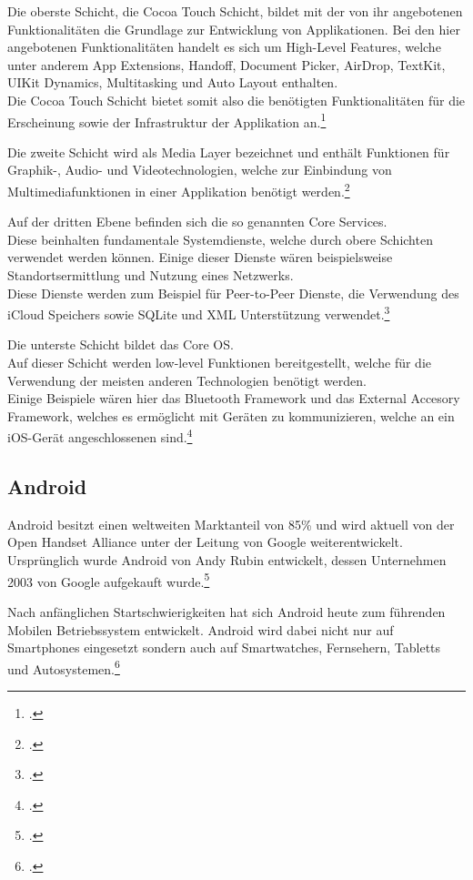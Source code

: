 Die oberste Schicht, die Cocoa Touch Schicht, bildet mit der von ihr angebotenen Funktionalitäten die Grundlage zur Entwicklung von Applikationen. Bei den hier angebotenen Funktionalitäten handelt es sich um High-Level Features, welche unter anderem App Extensions, Handoff, Document Picker, AirDrop, TextKit, UIKit Dynamics, Multitasking und Auto Layout enthalten.\\
Die Cocoa Touch Schicht bietet somit also die benötigten Funktionalitäten für die Erscheinung sowie der Infrastruktur der Applikation an.\footcite[vgl.:][]{CocoaTouchLayer}

Die zweite Schicht wird als Media Layer bezeichnet und enthält Funktionen für Graphik-, Audio- und Videotechnologien, welche zur Einbindung von Multimediafunktionen in einer Applikation benötigt werden.\footcite[vgl.:][]{MediaLayer}

Auf der dritten Ebene befinden sich die so genannten Core Services.\\
Diese beinhalten fundamentale Systemdienste, welche durch obere Schichten verwendet werden können. Einige dieser Dienste wären beispielsweise Standortsermittlung und Nutzung eines Netzwerks.\\
Diese Dienste werden zum Beispiel für Peer-to-Peer Dienste, die Verwendung des iCloud Speichers sowie SQLite und XML Unterstützung verwendet.\footcite[vgl.:][]{CoreServiceLayer}

Die unterste Schicht bildet das Core OS.\\
Auf dieser Schicht werden low-level Funktionen bereitgestellt, welche für die Verwendung der meisten anderen Technologien benötigt werden.\\
Einige Beispiele wären hier das Bluetooth Framework und das External Accesory Framework, welches es ermöglicht mit Geräten zu kommunizieren, welche an ein iOS-Gerät angeschlossenen sind.\footcite[vgl.:][]{CoreOSLayer}

\subsection{Android}
Android besitzt einen weltweiten Marktanteil von 85\% und wird aktuell von der Open Handset Alliance unter der Leitung von Google weiterentwickelt.\\
Ursprünglich wurde Android von Andy Rubin entwickelt, dessen Unternehmen 2003 von Google aufgekauft wurde.\footcite[vgl.:][]{heiseAndroid}

Nach anfänglichen Startschwierigkeiten hat sich Android heute zum führenden Mobilen Betriebssystem entwickelt. Android wird dabei nicht nur auf Smartphones eingesetzt sondern auch auf Smartwatches, Fernsehern, Tabletts und Autosystemen.\footcite[vgl.:][]{android}

